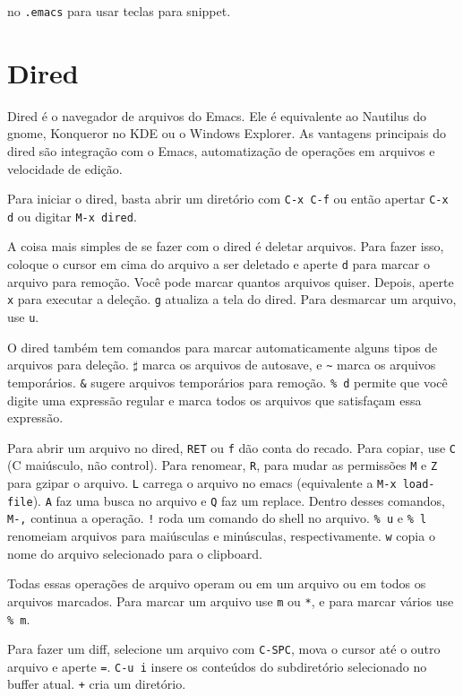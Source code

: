 \documentclass[12pt,brazil]{book}
\begin{document}
no \texttt{.emacs} para usar teclas para snippet.

\section{Dired}
\label{sec:dired}

Dired é o navegador de arquivos do Emacs. Ele é equivalente ao
Nautilus do gnome, Konqueror no KDE ou o Windows Explorer. As
vantagens principais do dired são integração com o Emacs,
automatização de operações em arquivos e velocidade de edição.

Para iniciar o dired, basta abrir um diretório com \texttt{C-x C-f} ou
então apertar \texttt{C-x d} ou digitar \texttt{M-x dired}.

A coisa mais simples de se fazer com o dired é deletar arquivos. Para
fazer isso, coloque o cursor em cima do arquivo a ser deletado e aperte
\texttt{d} para marcar o arquivo para remoção. Você pode marcar
quantos arquivos quiser. Depois, aperte \texttt{x} para executar a
deleção. \texttt{g} atualiza a tela do dired. Para desmarcar um
arquivo, use \texttt{u}.

O dired também tem comandos para marcar automaticamente alguns
tipos de arquivos para deleção. \texttt{$\sharp$} marca os arquivos de
autosave, e \texttt{\~} marca os arquivos temporários. \texttt{\&}
sugere arquivos temporários para remoção. \texttt{\% d} permite que você
digite uma expressão regular e marca todos os arquivos que satisfaçam
essa expressão.

Para abrir um arquivo no dired, \texttt{RET} ou \texttt{f} dão conta
do recado. Para copiar, use \texttt{C} (C maiúsculo, não
control). Para renomear, \texttt{R}, para mudar as permissões
\texttt{M} e \texttt{Z} para gzipar o arquivo. \texttt{L} carrega o
arquivo no emacs (equivalente a \texttt{M-x load-file}). \texttt{A}
faz uma busca no arquivo e \texttt{Q} faz um replace. Dentro desses
comandos, \texttt{M-,} continua a operação. \texttt{!} roda um comando
do shell no arquivo. \texttt{\% u} e \texttt{\% l} renomeiam arquivos
para maiúsculas e minúsculas, respectivamente. \texttt{w} copia o nome
do arquivo selecionado para o clipboard.

Todas essas operações de arquivo operam ou em um arquivo ou em todos
os arquivos marcados. Para marcar um arquivo use \texttt{m} ou
\texttt{*}, e para marcar vários use \texttt{\% m}.

Para fazer um diff, selecione um arquivo com \texttt{C-SPC}, mova o
cursor até o outro arquivo e aperte \texttt{=}. \texttt{C-u i} insere
os conteúdos do subdiretório selecionado no buffer atual. \texttt{+}
cria um diretório.
\end{document}
